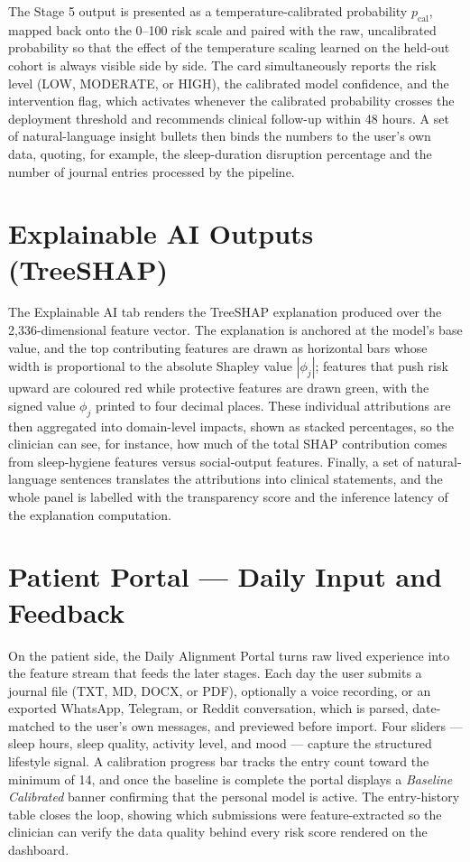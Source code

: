 \documentclass[10.5pt,a4paper]{article}
\begin{document}
The Stage 5 output is presented as a temperature-calibrated probability $p_{\text{cal}}$, mapped back onto the 0--100 risk scale and paired with the raw, uncalibrated probability so that the effect of the temperature scaling learned on the held-out cohort is always visible side by side. The card simultaneously reports the risk level (LOW, MODERATE, or HIGH), the calibrated model confidence, and the intervention flag, which activates whenever the calibrated probability crosses the deployment threshold and recommends clinical follow-up within 48 hours. A set of natural-language insight bullets then binds the numbers to the user's own data, quoting, for example, the sleep-duration disruption percentage and the number of journal entries processed by the pipeline.

\section*{Explainable AI Outputs (TreeSHAP)}

The Explainable AI tab renders the TreeSHAP explanation produced over the 2,336-dimensional feature vector. The explanation is anchored at the model's base value, and the top contributing features are drawn as horizontal bars whose width is proportional to the absolute Shapley value $|\phi_j|$; features that push risk upward are coloured red while protective features are drawn green, with the signed value $\phi_j$ printed to four decimal places. These individual attributions are then aggregated into domain-level impacts, shown as stacked percentages, so the clinician can see, for instance, how much of the total SHAP contribution comes from sleep-hygiene features versus social-output features. Finally, a set of natural-language sentences translates the attributions into clinical statements, and the whole panel is labelled with the transparency score and the inference latency of the explanation computation.

\section*{Patient Portal --- Daily Input and Feedback}

On the patient side, the Daily Alignment Portal turns raw lived experience into the feature stream that feeds the later stages. Each day the user submits a journal file (TXT, MD, DOCX, or PDF), optionally a voice recording, or an exported WhatsApp, Telegram, or Reddit conversation, which is parsed, date-matched to the user's own messages, and previewed before import. Four sliders --- sleep hours, sleep quality, activity level, and mood --- capture the structured lifestyle signal. A calibration progress bar tracks the entry count toward the minimum of 14, and once the baseline is complete the portal displays a \emph{Baseline Calibrated} banner confirming that the personal model is active. The entry-history table closes the loop, showing which submissions were feature-extracted so the clinician can verify the data quality behind every risk score rendered on the dashboard.
\end{document}
